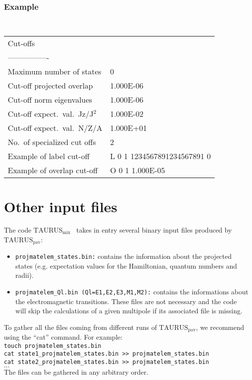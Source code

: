 \documentclass[a4paper,11pt]{article}
\newcommand{\TAURUSpav}{$\text{TAURUS}_{\text{pav}}$}
\newcommand{\TAURUSmix}{$\text{TAURUS}_{\text{mix}}$}
\newcommand{\ttt}[1]{\texttt{#1}}
\begin{document}
\subsubsection*{Example}
\begin{center}
\tt
\begin{tabular}{|ll|}
\hline
Cut-offs                      &          \\
----------------              &          \\
Maximum number of states      &0         \\
Cut-off projected overlap     &1.000E-06 \\
Cut-off norm eigenvalues      &1.000E-06 \\
Cut-off expect.~val.~Jz/J$^2$ &1.000E-02 \\
Cut-off expect.~val.~N/Z/A    &1.000E+01 \\
No.~of specialized cut offs   &2         \\
Example of label cut-off      &L \phantom{0}0 \phantom{0}1 1234567891234567891 \phantom{0}0  \\
Example of overlap cut-off    &O \phantom{0}0 \phantom{0}1 1.000E-05 \\
\hline
\end{tabular}
\end{center}

%
% 
\section{Other input files}

The code \TAURUSmix~ takes in entry several binary input files produced by \TAURUSpav: 
\begin{itemize}
  \item \ttt{projmatelem\_states.bin:} contains the information about the projected states (e.g. expectation values for the Hamiltonian, quantum numbers and radii).
  \item \ttt{projmatelem\_Ql.bin (Ql=E1,E2,E3,M1,M2):} contains the informations about the electromagnetic transitions. These files are not necessary and the code will 
        skip the calculations of a given multipole if its associated file is missing. 
\end{itemize}
To gather all the files coming from different runs of \TAURUSpav, we recommend using the ``cat'' command. For example: \\
{\tt touch projmatelem\_states.bin} \\
{\tt cat state1\_projmatelem\_states.bin >> projmatelem\_states.bin} \\
{\tt cat state2\_projmatelem\_states.bin >> projmatelem\_states.bin} \\
{\tt $\ldots$} \\
The files can be gathered in any arbitrary order.

%
%
\end{document}
